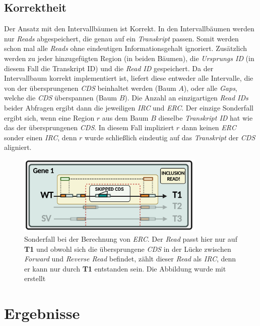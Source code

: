\documentclass[12pt]{article}
\begin{document}
\subsection{Korrektheit}\label{sec:Korrektheit}
Der Ansatz mit den Intervallbäumen ist Korrekt. In den Intervallbäumen werden nur \textit{Reads} abgespeichert, die genau auf
ein \textit{Transkript} passen. Somit werden schon mal alle \textit{Reads} ohne eindeutigen Informationsgehalt 
ignoriert. Zusätzlich werden zu jeder hinzugefügten Region (in beiden Bäumen), die \textit{Ursprungs ID}
(in diesem Fall die Transkript ID) und die \textit{Read ID} gespeichert. 
Da der Intervallbaum korrekt implementiert ist, liefert diese entweder alle 
Intervalle, die von der übersprungenen \textit{CDS} beinhaltet werden (Baum $A$),
oder alle \textit{Gaps}, welche die \textit{CDS} überspannen (Baum $B$).
Die Anzahl an einzigartigen \textit{Read IDs} beider Abfragen ergibt dann die 
jeweiligen \textit{IRC} und \textit{ERC}.
Der einzige Sonderfall ergibt sich, wenn eine Region $r$ aus dem Baum $B$ dieselbe
\textit{Transkript ID} hat wie das der übersprungenen \textit{CDS}. 
In diesem Fall impliziert $r$ dann keinen \textit{ERC} sonder einen \textit{IRC}, 
denn $r$ wurde schlie\ss lich eindeutig auf das \textit{Transkript} der \textit{CDS}
aligniert.
\begin{figure}[htpb]
    \centering
    \includegraphics[width=0.8\textwidth]{./figures/EdgeCase.png}
    \caption{Sonderfall bei der Berechnung von \textit{ERC}. Der \textit{Read} passt hier nur auf \textbf{T1} und obwohl sich die übersprungene \textit{CDS} in der Lücke zwischen
    \textit{Forward} und \textit{Reverse Read} befindet, zählt dieser \textit{Read} als \textit{IRC}, denn er kann nur durch \textbf{T1} entstanden sein.
Die Abbildung wurde mit \cite{biorender} erstellt}
    \label{fig:-figures-EdgeCase-png}
\end{figure}

\section{Ergebnisse}\label{sec:Ergebnisse}
\end{document}
